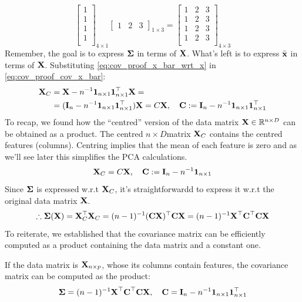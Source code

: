 \documentclass[a4paper]{article}
\begin{document}
\[
\begin{bmatrix}
1 \\
1 \\
1 \\
1 \\
\end{bmatrix}_{4\times 1}
\begin{bmatrix}
1 & 2 & 3
\end{bmatrix}_{1\times 3} = 
\begin{bmatrix}
1 & 2 & 3\\
1 & 2 & 3\\
1 & 2 & 3\\
1 & 2 & 3\\
\end{bmatrix}_{4\times 3}
\]
Remember, the goal is to express $\boldsymbol{\boldsymbol{\Sigma}}$ in terms of $\textbf{X}$. What's left is to express $\bar{\textbf{x}}$ in terms of $\textbf{X}$. Substituting \eqref{eq:cov_proof_x_bar_wrt_x} in \eqref{eq:cov_proof_cov_x_bar}:
\begin{align*}
\textbf{X}_C &= \textbf{X} - n^{-1} \textbf{1}_{n\times 1} \textbf{1}_{n\times 1}^{\top} \textbf{X} = \\
&= (\textbf{I}_n - n^{-1} \textbf{1}_{n\times 1} \textbf{1}_{n\times 1}^{\top}) \textbf{X}
= C\textbf{X}, \quad \textbf{C}:= \textbf{I}_n - n^{-1} \textbf{1}_{n\times 1} \textbf{1}_{n\times 1}^{\top}
\end{align*}
To recap, we found how the ``centred'' version of the data matrix $\textbf{X}\in \mathbb{R}^{n\times D}$ can be obtained as a product. The centred $n\times D$matrix $\textbf{X}_C$ contains the centred features (columns). Centring implies that the mean of each feature is zero and as we'll see later this simplifies the PCA calculations.
\begin{equation}
    \textbf{X}_C = C\textbf{X}, \quad \textbf{C}:= \textbf{I}_n - n^{-1} \textbf{1}_{n\times 1}
    \label{eq:centred_matrix_wrt_original}
\end{equation}
Since $\boldsymbol{\Sigma}$ is expressed w.r.t $\textbf{X}_C$, it's straightforwardd to express it w.r.t the original data matrix $\textbf{X}$.
\[
\therefore \boldsymbol{\Sigma}(\textbf{X}) = \textbf{X}_C^{\top}\textbf{X}_C = (n-1)^{-1}(\textbf{C}\textbf{X})^{\top}\textbf{C}\textbf{X} = (n-1)^{-1}\textbf{X}^{\top}\textbf{C}^{\top}\textbf{C}\textbf{X}
\]
To reiterate, we established that the covariance matrix can be efficiently computed as a product containing the data matrix and a constant one. 
\begin{corollary}
If the data matrix is $\textbf{X}_{n\times p}$, whose its columns contain features, the covariance matrix can be computed as the product:
\begin{equation}
    \boldsymbol{\Sigma} = (n-1)^{-1}\textbf{X}^{\top}\textbf{C}^{\top}\textbf{C}\textbf{X}, \quad \textbf{C} = \textbf{I}_n - n^{-1} \textbf{1}_{n\times 1} \textbf{1}_{n\times 1}^{\top}
    \label{eq:eq_cov_mat_def}
\end{equation}
\end{corollary}
\end{document}
